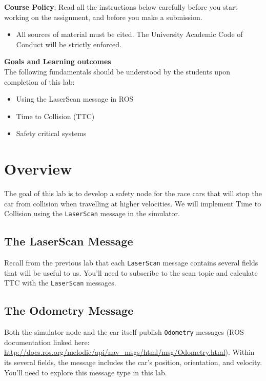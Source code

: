 \documentclass[letter]{article}
\begin{document}
\textbf{Course Policy}: Read all the instructions below carefully before you start working on the assignment, and before you make a submission.
\begin{itemize}
    \item All sources of material must be cited. The University Academic Code of Conduct
will be strictly enforced.
\end{itemize}
\textbf{Goals and Learning outcomes}\\
The following fundamentals should be understood by the students upon completion of this lab:
\begin{itemize}
    \item Using the LaserScan message in ROS
    \item Time to Collision (TTC)
    \item Safety critical systems
\end{itemize}


\section{Overview}
The goal of this lab is to develop a safety node for the race cars that will stop the car from collision when travelling at higher velocities. We will implement Time to Collision using the \texttt{LaserScan} message in the simulator.%
\subsection{The LaserScan Message}
Recall from the previous lab that each \texttt{LaserScan} message contains several fields that will be useful to us. You'll need to subscribe to the scan topic and calculate TTC with the \texttt{LaserScan} messages.

\subsection{The Odometry Message}
Both the simulator node and the car itself publish \texttt{Odometry} messages (ROS documentation linked here:\\
\href{http://docs.ros.org/melodic/api/nav_msgs/html/msg/Odometry.html}{http://docs.ros.org/melodic/api/nav\_msgs/html/msg/Odometry.html}). Within its several fields, the message includes the car's position, orientation, and velocity. You'll need to explore this message type in this lab.
\end{document}
